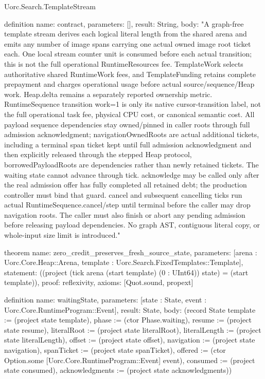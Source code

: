 \begin{lexlean}{Uorc.Search.TemplateStream}
\begin{semanticmodule}
definition{
  name: contract,
  parameters: [],
  result: String,
  body: "A graph-free template stream derives each logical literal length from the shared arena and emits any number of image spans carrying one actual owned image root ticket each. One local stream counter unit is consumed before each actual transition; this is not the full operational RuntimeResources fee. TemplateWork selects authoritative shared RuntimeWork fees, and TemplateFunding retains complete prepayment and charges operational usage before actual source/sequence/Heap work. Heap.delta remains a separately reported ownership metric. RuntimeSequence transition work=1 is only its native cursor-transition label, not the full operational task fee, physical CPU cost, or canonical semantic cost. All payload sequence dependencies stay owned/pinned in caller roots through full admission acknowledgment; navigationOwnedRoots are actual additional tickets, including a terminal span ticket kept until full admission acknowledgment and then explicitly released through the stepped Heap protocol, borrowedPayloadRoots are dependencies rather than newly retained tickets. The waiting state cannot advance through tick. acknowledge may be called only after the real admission offer has fully completed all retained debt; the production controller must bind that guard. cancel and subsequent cancelling ticks run actual RuntimeSequence.cancel/step until terminal before the caller may drop navigation roots. The caller must also finish or abort any pending admission before releasing payload dependencies. No graph AST, contiguous literal copy, or whole-input size limit is introduced."
}

theorem{
  name: zero_credit_preserves_fresh_source_state,
  parameters: [arena : Uorc.Core.Heap::Arena, template : Uorc.Search.FixedTemplates::Template],
  statement: ((project (tick arena (start template) (0 : UInt64)) state) = (start template)),
  proof: reflexivity{},
  axioms: [Quot.sound, propext]
}

definition{
  name: waitingState,
  parameters: [state : State, event : Uorc.Core.RuntimeProgram::Event],
  result: State,
  body: (record State {template := (project state template), phase := (ctor Phase.waiting), resume := (project state resume), literalRoot := (project state literalRoot), literalLength := (project state literalLength), offset := (project state offset), navigation := (project state navigation), spanTicket := (project state spanTicket), offered := (ctor Option.some [Uorc.Core.RuntimeProgram::Event] event), consumed := (project state consumed), acknowledgments := (project state acknowledgments)})
}


\end{semanticmodule}
\end{lexlean}
